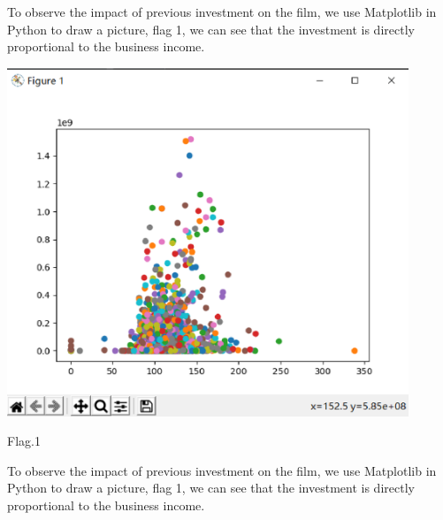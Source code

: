 To observe the impact of previous investment on the film, we use Matplotlib in Python to draw a picture, flag 1, we can see that the investment is directly proportional to the business income.

\begin{center}
  \begin{minipage}{0.3\linewidth}
  \centering

  \includegraphics[width=0.9\textwidth]{logos/22.eps}
 
  {\small{Flag.1}}

  \end{minipage}
  \hfill
\end{center}
To observe the impact of previous investment on the film, we use Matplotlib in Python to draw a picture, flag 1, we can see that the investment is directly proportional to the business income.

